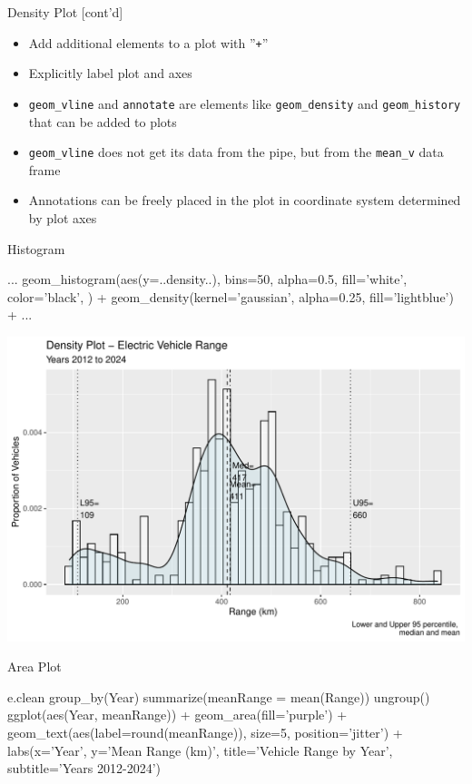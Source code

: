 \documentclass[ignorenonframetext,xcolor=x11names]{beamer}
\begin{document}
\begin{frame}{Density Plot [cont'd]}
\begin{itemize}
   \item Add additional elements to a plot with ''\texttt{+}''
   \item Explicitly label plot and axes
   \item \texttt{geom\_vline} and \texttt{annotate} are elements like \texttt{geom\_density} and \texttt{geom\_history} that can be added to plots
   \item \texttt{geom\_vline} does not get its data from the pipe, but from the \texttt{mean\_v} data frame
   \item Annotations can be freely placed in the plot in coordinate system determined by plot axes
\end{itemize}
\end{frame}

\begin{frame}[fragile]{Histogram}
\footnotesize
\begin{Rcode}
...
geom_histogram(aes(y=..density..), bins=50, 
     alpha=0.5, fill='white', color='black', ) +
geom_density(kernel='gaussian', 
     alpha=0.25, fill='lightblue') + 
...
\end{Rcode}
\begin{center}
  \includegraphics[width=.75\textwidth]{fuel.histogram.pdf}
\end{center}
\end{frame}

\begin{frame}[fragile]{Area Plot}
\footnotesize
\begin{Rcode}
e.clean %
  group_by(Year) %
  summarize(meanRange = mean(Range)) %
  ungroup() %
  ggplot(aes(Year, meanRange)) + 
    geom_area(fill='purple') +
    geom_text(aes(label=round(meanRange)), 
              size=5, position='jitter') +
    labs(x='Year', y='Mean Range (km)', 
         title='Vehicle Range by Year', 
         subtitle='Years 2012-2024')
\end{Rcode}
\end{frame}
\end{document}

